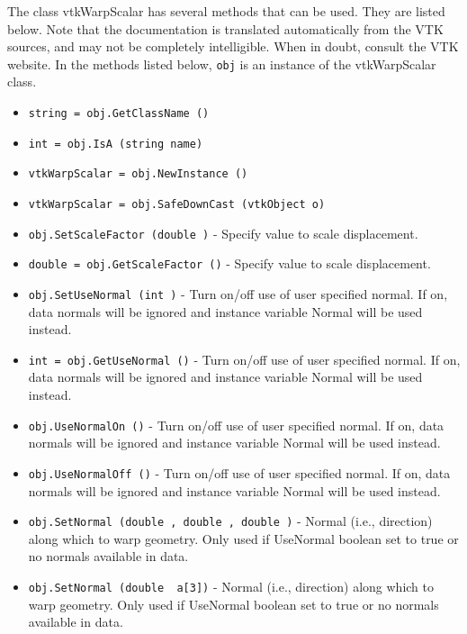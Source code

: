 The class vtkWarpScalar has several methods that can be used.
  They are listed below.
Note that the documentation is translated automatically from the VTK sources,
and may not be completely intelligible.  When in doubt, consult the VTK website.
In the methods listed below, \verb|obj| is an instance of the vtkWarpScalar class.
\begin{itemize}
\item  \verb|string = obj.GetClassName ()|

\item  \verb|int = obj.IsA (string name)|

\item  \verb|vtkWarpScalar = obj.NewInstance ()|

\item  \verb|vtkWarpScalar = obj.SafeDownCast (vtkObject o)|

\item  \verb|obj.SetScaleFactor (double )| -  Specify value to scale displacement.

\item  \verb|double = obj.GetScaleFactor ()| -  Specify value to scale displacement.

\item  \verb|obj.SetUseNormal (int )| -  Turn on/off use of user specified normal. If on, data normals
 will be ignored and instance variable Normal will be used instead.

\item  \verb|int = obj.GetUseNormal ()| -  Turn on/off use of user specified normal. If on, data normals
 will be ignored and instance variable Normal will be used instead.

\item  \verb|obj.UseNormalOn ()| -  Turn on/off use of user specified normal. If on, data normals
 will be ignored and instance variable Normal will be used instead.

\item  \verb|obj.UseNormalOff ()| -  Turn on/off use of user specified normal. If on, data normals
 will be ignored and instance variable Normal will be used instead.

\item  \verb|obj.SetNormal (double , double , double )| -  Normal (i.e., direction) along which to warp geometry. Only used
 if UseNormal boolean set to true or no normals available in data.

\item  \verb|obj.SetNormal (double  a[3])| -  Normal (i.e., direction) along which to warp geometry. Only used
 if UseNormal boolean set to true or no normals available in data.


\end{itemize}
